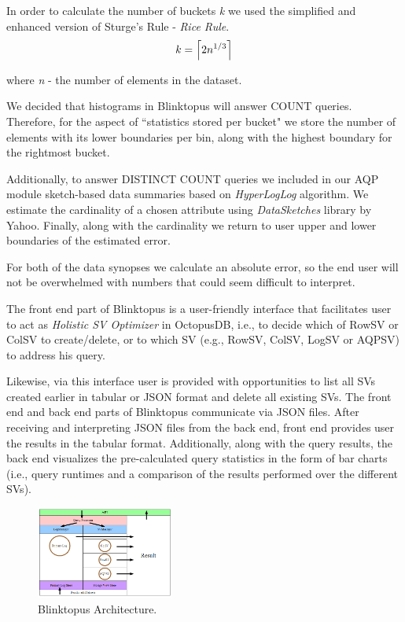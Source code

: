 \documentclass[10pt, conference, compsocconf]{IEEEtran}
\DeclarePairedDelimiter\ceil{\lceil}{\rceil}
\begin{document}
In order to calculate the number of buckets \textit{k} we used the simplified and enhanced version of Sturge's Rule - \textit{Rice Rule}.
\begin{equation}
k=\ceil*{2n^{1/3}}
\end{equation}

where \textit{n} - the number of elements in the dataset.
 
We decided that histograms in Blinktopus will answer COUNT queries. Therefore, for the aspect of ``statistics stored per bucket" we store the number of elements with its lower boundaries per bin, along with the highest boundary for the rightmost bucket.

Additionally, to answer DISTINCT COUNT queries we included in our AQP module sketch-based data summaries based on \textit{HyperLogLog} algorithm.  We estimate the cardinality of a chosen attribute using \textit{DataSketches} library by Yahoo. Finally, along with the cardinality we return to user upper and lower boundaries of the estimated error.

For both of the data synopses we calculate an absolute error, so the end user will not be overwhelmed with numbers that could seem difficult to interpret.

The front end part of Blinktopus is a user-friendly interface that facilitates user to act as \textit{Holistic SV Optimizer} in OctopusDB, i.e., to decide which of RowSV or ColSV to create/delete, or to which SV (e.g., RowSV, ColSV, LogSV or AQPSV) to address his query. 

Likewise, via this interface user is provided with opportunities to list all SVs created earlier in tabular or JSON format and delete all existing SVs.
The front end and back end parts of Blinktopus communicate via JSON files. After receiving and interpreting JSON files from the back end, front end provides user the results in the tabular format. Additionally, along with the query results, the back end visualizes the pre-calculated query statistics in the form of bar charts (i.e., query runtimes and a comparison of the results performed over the different SVs).

\begin{figure} \includegraphics[width=0.4\textwidth, center]{img/blinktopus_architecture.png} 
\caption{Blinktopus Architecture.}
\end{figure}
\end{document}
